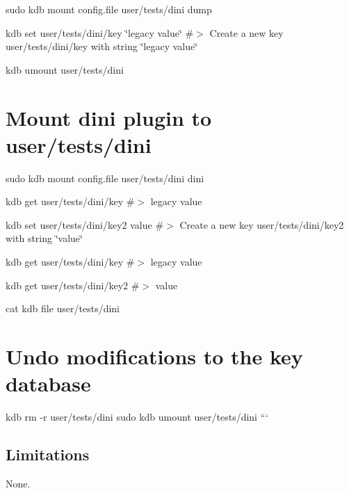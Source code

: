 sudo kdb mount config.\+file user/tests/dini dump

kdb set user/tests/dini/key \char`\"{}legacy value\char`\"{} \#$>$ Create a new key user/tests/dini/key with string \char`\"{}legacy value\char`\"{}

kdb umount user/tests/dini

\section*{Mount dini plugin to {\ttfamily user/tests/dini}}

sudo kdb mount config.\+file user/tests/dini dini

kdb get user/tests/dini/key \#$>$ legacy value

kdb set user/tests/dini/key2 value \#$>$ Create a new key user/tests/dini/key2 with string \char`\"{}value\char`\"{}

kdb get user/tests/dini/key \#$>$ legacy value

kdb get user/tests/dini/key2 \#$>$ value

cat {\ttfamily kdb file user/tests/dini}

\section*{Undo modifications to the key database}

kdb rm -\/r user/tests/dini sudo kdb umount user/tests/dini ```

\subsection*{Limitations}

None. 
